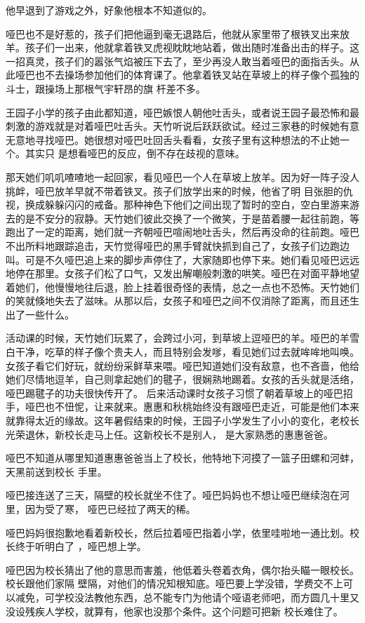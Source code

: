 \documentclass{article}
\begin{document}
他早退到了游戏之外，好象他根本不知道似的。 

哑巴也不是好惹的，孩子们把他逼到毫无退路后，他就从家里带了根铁叉出来放羊。孩子们一出来，他就拿着铁叉虎视眈眈地站着，做出随时准备出击的样子。这一招真灵，孩子们的嚣张气焰被压下去了，至少再没人敢当着哑巴的面指舌头。从此哑巴也不去操场参加他们的体育课了。他拿着铁叉站在草坡上的样子像个孤独的斗士，跟操场上那根气宇轩昂的旗
杆差不多。 

王园子小学的孩子由此都知道，哑巴嫉恨人朝他吐舌头，或者说王园子最恐怖和最刺激的游戏就是对着哑巴吐舌头。天竹听说后跃跃欲试。经过三家巷的时候她有意无意地寻找哑巴。她很想对哑巴吐回舌头看看，女孩子里有这种想法的不止她一个。其实只
是想看哑巴的反应，倒不存在歧视的意味。 

那天她们叽叽喳喳地一起回家，看见哑巴一个人在草坡上放羊。因为好一阵子没人挑衅，哑巴放羊早就不带着铁叉。孩子们放学出来的时候，他省了明
\newpage
目张胆的仇视，换成躲躲闪闪的戒备。那种神色下他们之间出现了暂时的空白，空白里游来游去的是不安分的寂静。天竹她们彼此交换了一个微笑，于是苗着腰一起往前跑，等跑出了一定的距离，她们就一齐朝哑巴喧闹地吐舌头，然后再没命的往前跑。哑巴不出所料地跟踪追击，天竹觉得哑巴的黑手臂就快抓到自己了，女孩子们边跑边叫。可是不久哑巴追上来的脚步声停住了，大家随即也停下来。她们看见哑巴远远地停在那里。女孩子们松了口气，又发出解嘲般刺激的哄笑。哑巴在对面平静地望着她们，他慢慢地往后退，脸上挂着很奇怪的表情，总之一点也不恐怖。天竹她们的笑就倏地失去了滋味。从那以后，女孩子和哑巴之间不仅消除了距离，而且还生出了一些什么。

活动课的时候，天竹她们玩累了，会跨过小河，到草坡上逗哑巴的羊。哑巴的羊雪白干净，吃草的样子像个贵夫人，而且特别会发嗲，看见她们过去就哞哞地叫唤。女孩子看它们好玩，就纷纷采鲜草来喂。哑巴知道她们没有敌意，也不吝啬，他给她们尽情地逗羊，自己则拿起她们的毽子，很娴熟地踢着。女孩的舌头就是活络，哑巴踢毽子的功夫很快传开了。
\newpage
后来活动课时女孩子习惯了朝着草坡上的哑巴招手，哑巴也不忸怩，让来就来。惠惠和秋桃始终没有跟哑巴走近，可能是他们本来就靠得太近的缘故。这年暑假结束的时候，王园子小学发生了小小的变化，老校长光荣退休，新校长走马上任。这新校长不是别人，
是大家熟悉的惠惠爸爸。 

哑巴不知道从哪里知道惠惠爸爸当上了校长，他特地下河摸了一篮子田螺和河蚌，天黑前送到校长
手里。 

哑巴接连送了三天，隔壁的校长就坐不住了。哑巴妈妈也不想让哑巴继续泡在河里，因为受了寒，
哑巴已经拉了两天的稀。 

哑巴妈妈很抱歉地看着新校长，然后拉着哑巴指着小学，依里哇啦地一通比划。校长终于听明白了
，哑巴想上学。 

哑巴因为校长猜出了他的意思而害羞，他低着头卷着衣角，偶尔抬头瞄一眼校长。校长跟他们家隔
\newpage
壁隔，对他们的情况知根知底。哑巴要上学没错，学费交不上可以减免，可学校没法教他东西，总不能专门为他请个哑语老师吧，而方圆几十里又没设残疾人学校，就算有，他家也没那个条件。这个问题可把新
校长难住了。 
\end{document}
